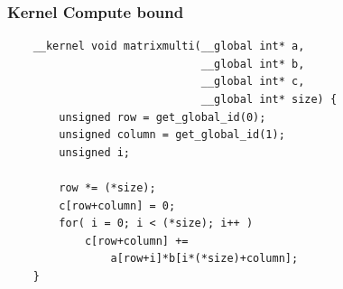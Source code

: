 \documentclass[brazil]{beamer}
\begin{document}

\begin{frame}[fragile]
  \frametitle{Kernel Compute bound}
  \begin{lstlisting}
    __kernel void matrixmulti(__global int* a, 
                              __global int* b, 
                              __global int* c, 
                              __global int* size) {
        unsigned row = get_global_id(0);
        unsigned column = get_global_id(1);
        unsigned i;
        
        row *= (*size);
        c[row+column] = 0;
        for( i = 0; i < (*size); i++ ) 
            c[row+column] += 
                a[row+i]*b[i*(*size)+column];
    }
  \end{lstlisting}
\end{frame}
\end{document}
